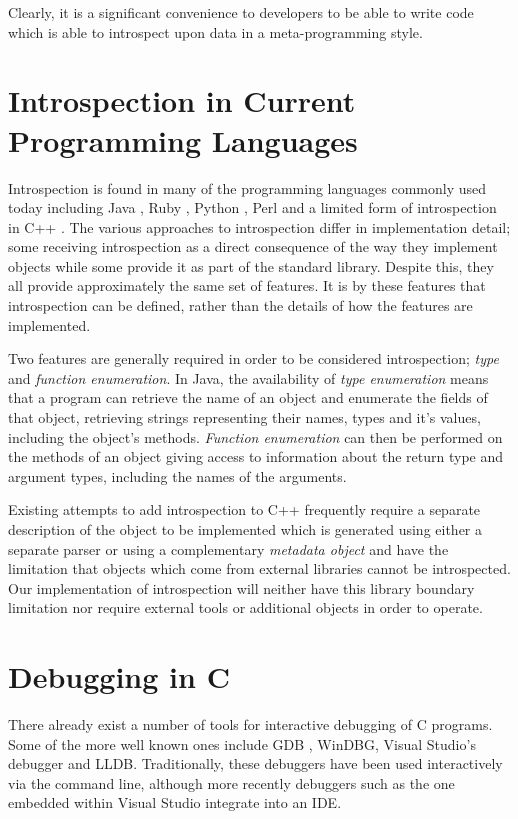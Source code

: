 \documentclass[draft]{article}
\begin{document}
Clearly, it is a significant convenience to developers to be able to write code
which is able to introspect upon data in a meta-programming style.

\section{Introspection in Current Programming Languages}
Introspection is found in many of the programming languages commonly used today
including Java \autocite{java-reflect}, Ruby \autocite{ruby-introspect},
Python \autocite{python-introspect}, Perl \autocite{perl-introspect} and a
limited form of introspection in C++ \autocite{cpp-rtti}. The various approaches
to introspection differ in implementation detail; some receiving introspection
as a direct consequence of the way they implement objects while some provide it
as part of the standard library. Despite this, they all provide approximately
the same set of features. It is by these features that introspection can be
defined, rather than the details of how the features are implemented.

Two features are generally required in order to be considered introspection;
\emph{type} and \emph{function enumeration}. In Java, the availability of
\emph{type enumeration} means that a program can retrieve the name of an object
and enumerate the fields of that object, retrieving strings representing their
names, types and it's values, including the object's methods. \emph{Function
enumeration} can then be performed on the methods of an object giving access to
information about the return type and argument types, including the names of the
arguments.

Existing attempts to add introspection to C++ frequently require a separate
description of the object to be implemented which is generated using either a
separate parser \autocite{seal-cpp} or using a complementary \emph{metadata object}
\autocite{deBayser:2012:SRT:2415308.2415317} and have the limitation that objects
which come from external libraries cannot be introspected. Our implementation of
introspection will neither have this library boundary limitation nor require
external tools or additional objects in order to operate.

\section{Debugging in C}
There already exist a number of tools for interactive debugging of C programs.
Some of the more well known ones include GDB \autocite{gdb}, WinDBG, Visual Studio's
debugger and LLDB. \autocite{lldb} Traditionally, these debuggers have been used
interactively via the command line, although more recently debuggers such as the
one embedded within Visual Studio integrate into an IDE.
\end{document}
